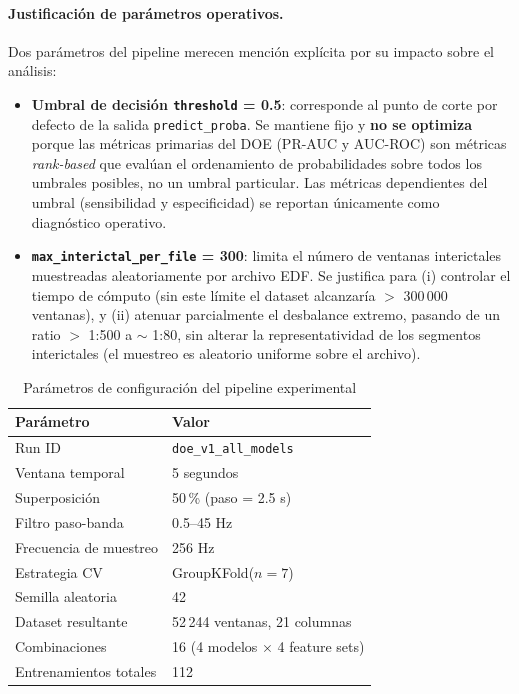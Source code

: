 \documentclass[12pt,a4paper]{article}
\begin{document}
\paragraph{Justificación de parámetros operativos.}
Dos parámetros del pipeline merecen mención explícita por su impacto sobre el análisis:

\begin{itemize}
\item \textbf{Umbral de decisión \texttt{threshold} = 0.5}: corresponde al punto de corte
  por defecto de la salida \texttt{predict\_proba}. Se mantiene fijo y \textbf{no se
  optimiza} porque las métricas primarias del DOE (PR-AUC y AUC-ROC) son métricas
  \textit{rank-based} que evalúan el ordenamiento de probabilidades sobre todos los
  umbrales posibles, no un umbral particular. Las métricas dependientes del umbral
  (sensibilidad y especificidad) se reportan únicamente como diagnóstico operativo.
\item \textbf{\texttt{max\_interictal\_per\_file} = 300}: limita el número de ventanas
  interictales muestreadas aleatoriamente por archivo EDF. Se justifica para
  (i) controlar el tiempo de cómputo (sin este límite el dataset alcanzaría
  $>$ 300\,000 ventanas), y (ii) atenuar parcialmente el desbalance extremo, pasando
  de un ratio $>$ 1:500 a $\sim$ 1:80, sin alterar la representatividad de los
  segmentos interictales (el muestreo es aleatorio uniforme sobre el archivo).
\end{itemize}

\begin{table}[H]
\centering
\caption{Parámetros de configuración del pipeline experimental}
\label{tab:pipeline_config}
\renewcommand{\arraystretch}{1.2}
\begin{tabular}{ll}
\toprule
\textbf{Parámetro} & \textbf{Valor} \\
\midrule
Run ID             & \texttt{doe\_v1\_all\_models} \\
Ventana temporal   & 5 segundos \\
Superposición      & 50\,\% (paso = 2.5 s) \\
Filtro paso-banda  & 0.5--45 Hz \\
Frecuencia de muestreo & 256 Hz \\
Estrategia CV      & GroupKFold($n=7$) \\
Semilla aleatoria  & 42 \\
Dataset resultante & 52\,244 ventanas, 21 columnas \\
Combinaciones      & 16 (4 modelos $\times$ 4 feature sets) \\
Entrenamientos totales & 112 \\
\bottomrule
\end{tabular}
\end{table}
\end{document}
